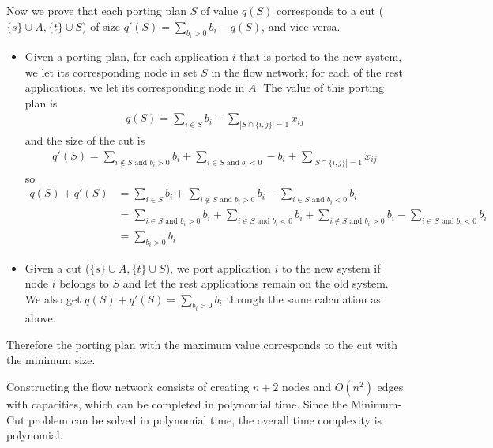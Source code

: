 \documentclass[12pt,letterpaper]{article}
\begin{document}
Now we prove that each porting plan $S$ of value $q(S)$ corresponds to a cut ($\{s\}\cup A, \{t\}\cup S$) of size $q'(S)=\sum_{b_i>0} b_i-q(S)$, and vice versa.
\begin{itemize}
\item Given a porting plan, for each application $i$ that is ported to the new system, we let its corresponding node in set $S$ in the flow network; for each of the rest applications, we let its corresponding node in $A$. The value of this porting plan is 
\begin{align}
q(S)=\sum_{i\in S}b_i-\sum_{|S\cap \{i,j\}|=1}x_{ij}
\end{align}
and the size of the cut is 
\begin{align}
q'(S)=\sum_{i\notin S\textrm{ and }b_i>0}b_i+\sum_{i\in S\textrm{ and }b_i<0}-b_i+\sum_{|S\cap \{i,j\}|=1}x_{ij}
\end{align}
so 
\begin{align}
\nonumber q(S)+q'(S) & = \sum_{i\in S}b_i+\sum_{i\notin S\textrm{ and }b_i>0}b_i-\sum_{i\in S\textrm{ and }b_i<0}b_i\\\nonumber
& = \sum_{i\in S\textrm{ and }b_i>0}b_i+\sum_{i\in S\textrm{ and }b_i<0}b_i+\sum_{i\notin S\textrm{ and }b_i>0}b_i-\sum_{i\in S\textrm{ and }b_i<0}b_i\\\nonumber
& = \sum_{b_i>0}b_i
\end{align}
\item Given a cut ($\{s\}\cup A, \{t\}\cup S$), we port application $i$ to the new system if node $i$ belongs to $S$ and let the rest applications remain on the old system. We also get $q(S)+q'(S)=\sum_{b_i>0} b_i$ through the same calculation as above.
\end{itemize}
Therefore the porting plan with the maximum value corresponds to the cut with the minimum size.

Constructing the flow network consists of creating $n+2$ nodes and $O(n^2)$ edges with capacities, which can be completed in polynomial time. Since the Minimum-Cut problem can be solved in polynomial time, the overall time complexity is polynomial.
\end{document}
